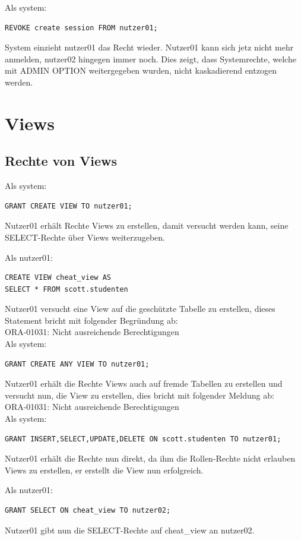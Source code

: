 \documentclass[10pt]{scrreprt}
\begin{document}
Als system:
\begin{lstlisting}[style=sql]
REVOKE create session FROM nutzer01;
\end{lstlisting}
System einzieht nutzer01 das Recht wieder. Nutzer01 kann sich jetz nicht mehr anmelden, nutzer02 hingegen immer noch. Dies zeigt, dass Systemrechte, welche mit ADMIN OPTION weitergegeben wurden, nicht kaskadierend entzogen werden.

\section{Views}
\subsection{Rechte von Views}
Als system:
\begin{lstlisting}[style=sql]
GRANT CREATE VIEW TO nutzer01;
\end{lstlisting}
Nutzer01 erhält Rechte Views zu erstellen, damit versucht werden kann, seine SELECT-Rechte über Views weiterzugeben.

Als nutzer01:
\begin{lstlisting}[style=sql]
CREATE VIEW cheat_view AS
SELECT * FROM scott.studenten
\end{lstlisting}
Nutzer01 versucht eine View auf die geschützte Tabelle zu erstellen, dieses Statement bricht mit folgender Begründung ab:\\
ORA-01031: Nicht ausreichende Berechtigungen\\
\newpage
Als system:
\begin{lstlisting}[style=sql]
GRANT CREATE ANY VIEW TO nutzer01;
\end{lstlisting}
Nutzer01 erhält die Rechte Views auch auf fremde Tabellen zu erstellen und versucht nun, die View zu erstellen, dies bricht mit folgender Meldung ab:\\
ORA-01031: Nicht ausreichende Berechtigungen\\

Als system:
\begin{lstlisting}[style=sql]
GRANT INSERT,SELECT,UPDATE,DELETE ON scott.studenten TO nutzer01;
\end{lstlisting}
Nutzer01 erhält die Rechte nun direkt, da ihm die Rollen-Rechte nicht erlauben Views zu erstellen, er erstellt die View nun erfolgreich.

Als nutzer01:
\begin{lstlisting}[style=sql]
GRANT SELECT ON cheat_view TO nutzer02;
\end{lstlisting}
Nutzer01 gibt nun die SELECT-Rechte auf cheat\_view an nutzer02.
\end{document}
